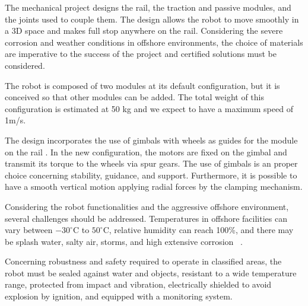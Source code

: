 \documentclass{ifacconf}
\begin{document}
The mechanical project designs the rail, the
traction and passive modules, and the joints used to couple them. The design
allows the robot to move smoothly in a 3D space and makes full stop anywhere
on the rail. Considering the severe corrosion and weather conditions in
offshore environments, the choice of materials are imperative to the success of
the project and certified solutions must be considered.

The robot is composed of two modules at its default configuration, but it is
conceived so that other modules can be added. The total weight of this
configuration is estimated at 50 kg and we expect to have a maximum speed of
1m/s.

The design incorporates the use of gimbals with wheels as guides for
the module on the rail \cite{cba}. In the new configuration, the motors are
fixed on the gimbal and transmit its torque to the wheels via spur gears. The use of gimbals
is an proper choice concerning stability, guidance, and support. Furthermore,
it is possible to have a smooth vertical motion applying radial forces by the
clamping mechanism.



Considering the robot functionalities and the aggressive offshore environment,
several challenges should be addressed. Temperatures in offshore facilities can
vary between $-30^{\circ}$C to $50^{\circ}$C, relative humidity can reach
100\%, and there may be splash water, salty air, storms, and high extensive
corrosion ~\cite{graf2007mobile}. 

Concerning robustness and safety required to operate in classified areas, the
robot must be sealed against water and objects, resistant to a wide temperature
range, protected from impact and vibration, electrically shielded to avoid
explosion by ignition, and equipped with a monitoring system.
\end{document}
